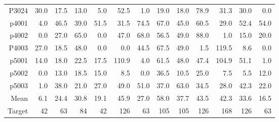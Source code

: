 \begin{table}
\begin{tabular}{rrrrrrrrrrrrr}
    P3024 & 30.0  & 17.5  & 13.0  & 5.0   & 52.5  & 1.0   & 19.0  & 18.0  & 78.9  & 31.3  & 30.0  & 0.0 \\
    p4001 & 4.0   & 46.5  & 39.0  & 51.5  & 31.5  & 74.5  & 67.0  & 45.0  & 60.5  & 29.0  & 52.4  & 54.0 \\
    p4002 & 0.0   & 27.0  & 65.0  & 0.0   & 47.0  & 68.0  & 56.5  & 49.0  & 88.0  & 1.0   & 15.0  & 20.0 \\
    P4003 & 27.0  & 18.5  & 48.0  & 0.0   & 0.0   & 44.5  & 67.5  & 49.0  & 1.5   & 119.5 & 8.6   & 0.0 \\
    p5001 & 14.0  & 18.0  & 22.5  & 17.5  & 110.9 & 4.0   & 61.5  & 48.0  & 47.4  & 104.9 & 51.1  & 1.0 \\
    p5002 & 0.0   & 13.0  & 18.5  & 15.0  & 8.5   & 0.0   & 36.5  & 10.5  & 25.0  & 7.5   & 5.5   & 12.0 \\
    p5003 & 1.0   & 38.0  & 21.0  & 27.0  & 49.0  & 51.0  & 37.0  & 63.0  & 34.5  & 28.0  & 42.3  & 22.0 \\
\midrule
    Mean  & 6.1   & 24.4  & 30.8  & 19.1  & 45.9  & 27.0  & 58.0  & 37.7  & 43.5  & 42.3  & 33.6  & 16.5 \\
\midrule
    Target  & 42   & 63  & 84  & 42  & 126  & 63  & 105  & 105  & 126  & 168  & 126  & 63 \\
    \bottomrule
    \end{tabular}%
  \label{tab:insituComponentCounts}%
\end{table}%

